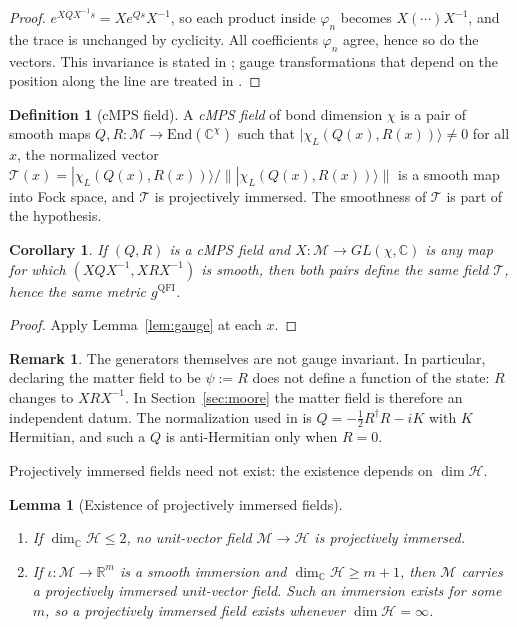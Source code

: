 \documentclass[11pt,a4paper,reqno]{amsart}
\newtheorem{lemma}[theorem]{Lemma}
\newtheorem{corollary}[theorem]{Corollary}
\theoremstyle{definition}
\newtheorem{definition}[theorem]{Definition}
\newtheorem{remark}[theorem]{Remark}
\numberwithin{equation}{section}
\newcommand{\R}{\mathbb{R}}
\newcommand{\C}{\mathbb{C}}
\newcommand{\End}{\mathrm{End}}
\newcommand{\QFI}{\mathrm{QFI}}
\begin{document}
\begin{proof}
$e^{XQX^{-1}s}=Xe^{Qs}X^{-1}$, so each product inside $\varphi_n$ becomes $X(\cdots)X^{-1}$, and the trace is unchanged by cyclicity. All coefficients $\varphi_n$ agree, hence so do the vectors. This invariance is stated in \cite{verstraete2010continuous}; gauge transformations that depend on the position along the line are treated in \cite[Sec.~VI, Eq.~(55)]{haegeman2013calculus}.
\end{proof}

\begin{definition}[cMPS field]\label{def:cmps-field}
A \emph{cMPS field} of bond dimension $\chi$ is a pair of smooth maps $Q,R:\mathcal{M}\to\End(\C^\chi)$ such that $|\chi_L(Q(x),R(x))\rangle\neq0$ for all $x$, the normalized vector $\mathcal{T}(x)=|\chi_L(Q(x),R(x))\rangle/\||\chi_L(Q(x),R(x))\rangle\|$ is a smooth map into Fock space, and $\mathcal{T}$ is projectively immersed. The smoothness of $\mathcal{T}$ is part of the hypothesis.
\end{definition}

\begin{corollary}\label{cor:gauge}
If $(Q,R)$ is a cMPS field and $X:\mathcal{M}\to GL(\chi,\C)$ is any map for which $(XQX^{-1},XRX^{-1})$ is smooth, then both pairs define the same field $\mathcal{T}$, hence the same metric $g^{\QFI}$.
\end{corollary}

\begin{proof}
Apply Lemma~\ref{lem:gauge} at each $x$.
\end{proof}

\begin{remark}\label{rem:gauge-matter}
The generators themselves are not gauge invariant. In particular, declaring the matter field to be $\psi:=R$ does not define a function of the state: $R$ changes to $XRX^{-1}$. In Section~\ref{sec:moore} the matter field is therefore an independent datum. The normalization used in \cite{verstraete2010continuous} is $Q=-\tfrac12R^\dagger R-iK$ with $K$ Hermitian, and such a $Q$ is anti-Hermitian only when $R=0$.
\end{remark}

Projectively immersed fields need not exist: the existence depends on $\dim\mathcal{H}$.

\begin{lemma}[Existence of projectively immersed fields]\label{lem:existence}
\begin{enumerate}[label=(\alph*)]
    \item If $\dim_\C\mathcal{H}\le2$, no unit-vector field $\mathcal{M}\to\mathcal{H}$ is projectively immersed.
    \item If $\iota:\mathcal{M}\to\R^m$ is a smooth immersion and $\dim_\C\mathcal{H}\ge m+1$, then $\mathcal{M}$ carries a projectively immersed unit-vector field. Such an immersion exists for some $m$, so a projectively immersed field exists whenever $\dim\mathcal{H}=\infty$.
\end{enumerate}
\end{lemma}
\end{document}
